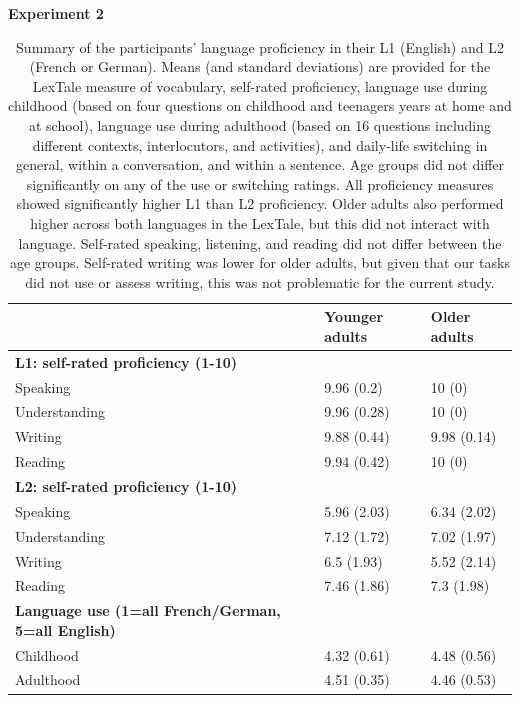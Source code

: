\documentclass[
]{article}
\begin{document}
\newpage

\textbf{Experiment 2}

\begin{table}[H]

\caption{\label{tab:TableS6}Summary of the participants’ language proficiency in their L1 (English) and L2 (French or German). Means (and standard deviations) are provided for the LexTale measure of vocabulary, self-rated proficiency, language use during childhood (based on four questions on childhood and teenagers years at home and at school), language use during adulthood (based on 16 questions including different contexts, interlocutors, and activities), and daily-life switching in general, within a conversation, and within a sentence. Age groups did not differ significantly on any of the use or switching ratings. All proficiency measures showed significantly higher L1 than L2 proficiency. Older adults also performed higher across both languages in the LexTale, but this did not interact with language. Self-rated speaking, listening, and reading did not differ between the age groups. Self-rated writing was lower for older adults, but given that our tasks did not use or assess writing, this was not problematic for the current study.}
\centering
\begin{tabular}[t]{lll}
\toprule
\textbf{} & \textbf{Younger adults} & \textbf{Older adults}\\
\midrule
\textbf{L1: self-rated proficiency (1-10)} & \textbf{} & \textbf{}\\
Speaking & 9.96 (0.2) & 10 (0)\\
Understanding & 9.96 (0.28) & 10 (0)\\
Writing & 9.88 (0.44) & 9.98 (0.14)\\
Reading & 9.94 (0.42) & 10 (0)\\
\addlinespace
\textbf{L2: self-rated proficiency (1-10)} & \textbf{} & \textbf{}\\
Speaking & 5.96 (2.03) & 6.34 (2.02)\\
Understanding & 7.12 (1.72) & 7.02 (1.97)\\
Writing & 6.5 (1.93) & 5.52 (2.14)\\
Reading & 7.46 (1.86) & 7.3 (1.98)\\
\addlinespace
\textbf{Language use (1=all French/German, 5=all English)} & \textbf{} & \textbf{}\\
Childhood & 4.32 (0.61) & 4.48 (0.56)\\
Adulthood & 4.51 (0.35) & 4.46 (0.53)\\

\end{tabular}
\end{table}
\end{document}
